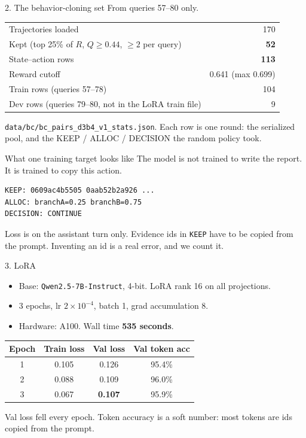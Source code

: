 \documentclass[aspectratio=169,11pt]{beamer}
\begin{document}
\begin{frame}{2. The behavior-cloning set}
  From queries 57--80 only.
  \vspace{0.3em}
  \begin{tabular}{lr}
    \hline
    Trajectories loaded & 170 \\
    Kept (top 25\% of $R$, $Q \ge 0.44$, $\ge 2$ per query) & \textbf{52} \\
    State--action rows & \textbf{113} \\
    Reward cutoff & 0.641 (max 0.699) \\
    Train rows (queries 57--78) & 104 \\
    Dev rows (queries 79--80, not in the LoRA train file) & 9 \\
    \hline
  \end{tabular}
  \vspace{0.4em}
  {\small \texttt{data/bc/bc\_pairs\_d3b4\_v1\_stats.json}. Each row is one round: the serialized pool, and the KEEP / ALLOC / DECISION the random policy took.}
\end{frame}

\begin{frame}[fragile]{What one training target looks like}
  The model is not trained to write the report. It is trained to copy this action.
  \vspace{0.3em}
  \begin{verbatim}
KEEP: 0609ac4b5505 0aab52b2a926 ...
ALLOC: branchA=0.25 branchB=0.75
DECISION: CONTINUE
  \end{verbatim}
  \vspace{0.2em}
  Loss is on the assistant turn only. Evidence ids in \texttt{KEEP} have to be copied from the prompt. Inventing an id is a real error, and we count it.
\end{frame}

\begin{frame}{3. LoRA}
  \begin{itemize}
    \item Base: \texttt{Qwen2.5-7B-Instruct}, 4-bit. LoRA rank 16 on all projections.
    \item 3 epochs, lr $2\times 10^{-4}$, batch 1, grad accumulation 8.
    \item Hardware: A100. Wall time \textbf{535 seconds}.
  \end{itemize}
  \vspace{0.3em}
  \begin{tabular}{cccc}
    \hline
    Epoch & Train loss & Val loss & Val token acc \\
    \hline
    1 & 0.105 & 0.126 & 95.4\% \\
    2 & 0.088 & 0.109 & 96.0\% \\
    3 & 0.067 & \textbf{0.107} & 95.9\% \\
    \hline
  \end{tabular}
  \vspace{0.4em}
  Val loss fell every epoch. Token accuracy is a soft number: most tokens are ids copied from the prompt.
\end{frame}
\end{document}

